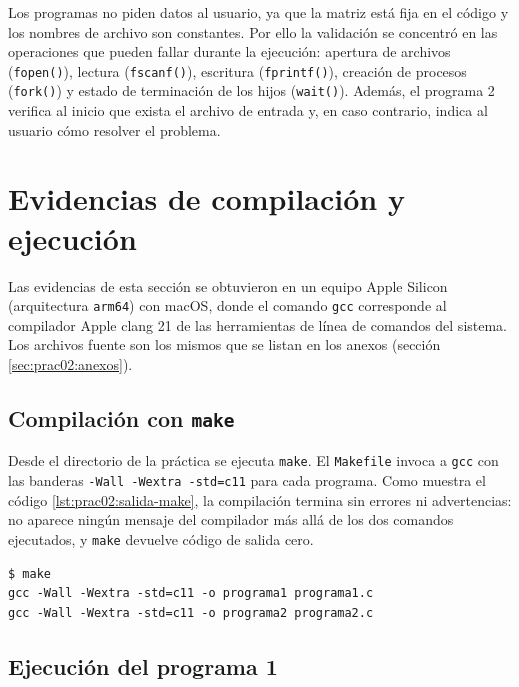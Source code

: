 Los programas no piden datos al usuario, ya que la matriz está fija en el código y los nombres de archivo son constantes. Por ello la validación se concentró en las operaciones que pueden fallar durante la ejecución: apertura de archivos (\texttt{fopen()}), lectura (\texttt{fscanf()}), escritura (\texttt{fprintf()}), creación de procesos (\texttt{fork()}) y estado de terminación de los hijos (\texttt{wait()}). Además, el programa 2 verifica al inicio que exista el archivo de entrada y, en caso contrario, indica al usuario cómo resolver el problema.


\section{Evidencias de compilación y ejecución}
\label{sec:prac02:evidencias}

Las evidencias de esta sección se obtuvieron en un equipo Apple Silicon (arquitectura \texttt{arm64}) con macOS, donde el comando \texttt{gcc} corresponde al compilador Apple clang 21 de las herramientas de línea de comandos del sistema. Los archivos fuente son los mismos que se listan en los anexos (sección \ref{sec:prac02:anexos}).

\subsection{Compilación con \texttt{make}}
\label{sec:prac02:evid-compilacion}

Desde el directorio de la práctica se ejecuta \texttt{make}. El \texttt{Makefile} invoca a \texttt{gcc} con las banderas \texttt{-Wall -Wextra -std=c11} para cada programa. Como muestra el código \ref{lst:prac02:salida-make}, la compilación termina sin errores ni advertencias: no aparece ningún mensaje del compilador más allá de los dos comandos ejecutados, y \texttt{make} devuelve código de salida cero.

\begin{lstlisting}[numbers=none, language={}, caption={Compilación de los dos programas con \texttt{make}.}, label={lst:prac02:salida-make}]
$ make
gcc -Wall -Wextra -std=c11 -o programa1 programa1.c
gcc -Wall -Wextra -std=c11 -o programa2 programa2.c
\end{lstlisting}

\subsection{Ejecución del programa 1}
\label{sec:prac02:evid-programa1}

